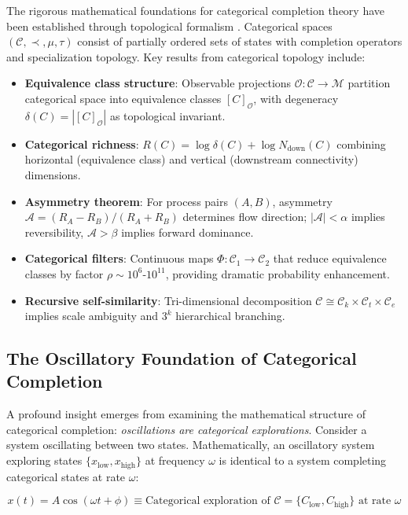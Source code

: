 \documentclass[11pt]{article}
\begin{document}
The rigorous mathematical foundations for categorical completion theory have been established through topological formalism \citep{Sachikonye2025topology}. Categorical spaces $(\mathcal{C}, \prec, \mu, \tau)$ consist of partially ordered sets of states with completion operators and specialization topology. Key results from categorical topology include:

\begin{itemize}
\item \textbf{Equivalence class structure}: Observable projections $\mathcal{O}: \mathcal{C} \to \mathcal{M}$ partition categorical space into equivalence classes $[C]_{\mathcal{O}}$, with degeneracy $\delta(C) = |[C]_{\mathcal{O}}|$ as topological invariant.
\item \textbf{Categorical richness}: $R(C) = \log \delta(C) + \log N_{\text{down}}(C)$ combining horizontal (equivalence class) and vertical (downstream connectivity) dimensions.
\item \textbf{Asymmetry theorem}: For process pairs $(A, B)$, asymmetry $\mathcal{A} = (R_A - R_B)/(R_A + R_B)$ determines flow direction; $|\mathcal{A}| < \alpha$ implies reversibility, $\mathcal{A} > \beta$ implies forward dominance.
\item \textbf{Categorical filters}: Continuous maps $\Phi: \mathcal{C}_1 \to \mathcal{C}_2$ that reduce equivalence classes by factor $\rho \sim 10^6$-$10^{11}$, providing dramatic probability enhancement.
\item \textbf{Recursive self-similarity}: Tri-dimensional decomposition $\mathcal{C} \cong \mathcal{C}_k \times \mathcal{C}_t \times \mathcal{C}_e$ implies scale ambiguity and $3^k$ hierarchical branching.
\end{itemize}

\subsection{The Oscillatory Foundation of Categorical Completion}

A profound insight emerges from examining the mathematical structure of categorical completion: \textit{oscillations are categorical explorations}. Consider a system oscillating between two states. Mathematically, an oscillatory system exploring states $\{x_{\text{low}}, x_{\text{high}}\}$ at frequency $\omega$ is identical to a system completing categorical states at rate $\omega$:

\begin{equation}
x(t) = A\cos(\omega t + \phi) \equiv \text{Categorical exploration of } \mathcal{C} = \{C_{\text{low}}, C_{\text{high}}\} \text{ at rate } \omega
\end{equation}
\end{document}
